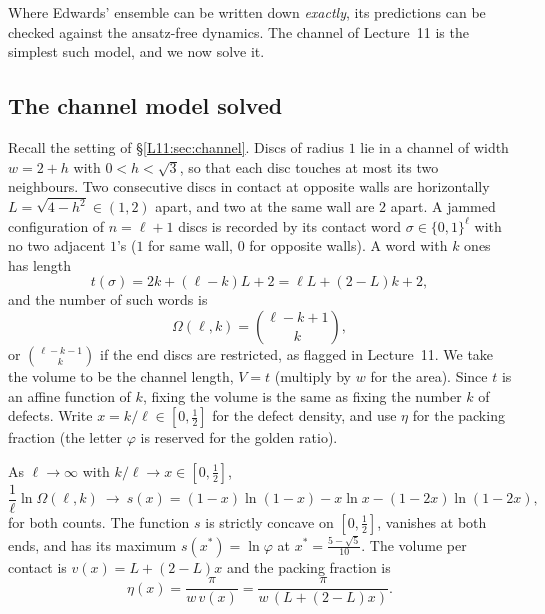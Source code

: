 Where Edwards' ensemble can be written down \emph{exactly}, its predictions can be checked against the
ansatz-free dynamics. The channel of Lecture~11 is the simplest such model, and we now solve it.

\subsection{The channel model solved}
\label{SM:sec:channel}

Recall the setting of \S\ref{L11:sec:channel}. Discs of radius $1$ lie in a channel of width $w=2+h$
with $0<h<\sqrt3$, so that each disc touches at most its two neighbours. Two consecutive discs in
contact at opposite walls are horizontally $L=\sqrt{4-h^2}\in(1,2)$ apart, and two at the same wall are
$2$ apart. A jammed configuration of $n=\ell+1$ discs is recorded by its contact word
$\sigma\in\{0,1\}^\ell$ with no two adjacent $1$'s ($1$ for same wall, $0$ for opposite walls). A word
with $k$ ones has length
\[
  t(\sigma)=2k+(\ell-k)L+2=\ell L+(2-L)k+2,
\]
and the number of such words is
\[
  \Omega(\ell,k)=\binom{\ell-k+1}{k},
\]
or $\binom{\ell-k-1}{k}$ if the end discs are restricted, as flagged in Lecture~11.
We take the volume to be the channel length, $V=t$ (multiply by $w$ for the area). Since $t$ is an affine
function of $k$, fixing the volume is the same as fixing the number $k$ of defects. Write
$x=k/\ell\in[0,\frac12]$ for the defect density, and use $\eta$ for the packing fraction (the letter
$\varphi$ is reserved for the golden ratio).

\begin{proposition}\label{SM:prop:entropy}
As $\ell\to\infty$ with $k/\ell\to x\in[0,\frac12]$,
\[
  \frac1\ell\ln\Omega(\ell,k)\ \longrightarrow\ s(x)=(1-x)\ln(1-x)-x\ln x-(1-2x)\ln(1-2x),
\]
for both counts. The function $s$ is strictly concave on $[0,\frac12]$, vanishes at both ends, and has
its maximum $s(x^*)=\ln\varphi$ at $x^*=\frac{5-\sqrt5}{10}$. The volume per contact is
$v(x)=L+(2-L)x$ and the packing fraction is
\[
  \eta(x)=\frac{\pi}{w\,v(x)}=\frac{\pi}{w\,(L+(2-L)x)} .
\]
\end{proposition}

